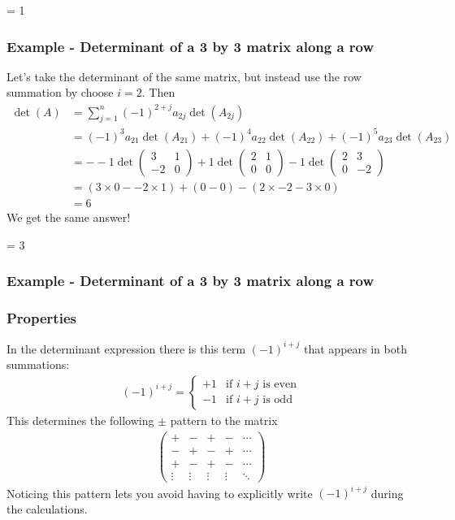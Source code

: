 \documentclass[usenames,dvipsnames,aspectratio=169,10pt]{beamer}
\def \EXAMPLEVERSION {1} %
\numberwithin{equation}{section}
\begin{document}
\ifnum \EXAMPLEVERSION = 1
\begin{frame}
\frametitle{Example - Determinant of a 3 by 3 matrix along a row}
Let's take the determinant of the same matrix, but instead use the row summation by choose $i=2$. Then
\begin{align*}
\det(A) &= \sum_{j=1}^n (-1)^{2+j} a_{2j} \det(A_{2j}) \\
 &= (-1)^{3} a_{21} \det(A_{21}) + (-1)^{4} a_{22} \det(A_{22}) + (-1)^{5} a_{23} \det(A_{23}) \\
 &= - -1 
 \det\begin{pmatrix}
  3 & 1 \\
 -2 & 0 
\end{pmatrix}
 + 1 
 \det\begin{pmatrix}
 2 &  1 \\
 0 &  0 
\end{pmatrix} 
- 1 
\det\begin{pmatrix}
 2 &  3 \\
 0 & -2 
\end{pmatrix} \\
 &= (3\times 0 - -2\times 1) + (0 - 0)- (2\times -2 - 3\times 0 ) \\
 &= 6
\end{align*}
We get the same answer!
\end{frame}
\fi 


\ifnum \EXAMPLEVERSION = 3
\begin{frame}
\frametitle{Example - Determinant of a 3 by 3 matrix along a row}
\end{frame}
\fi 



\begin{frame}
\frametitle{Properties}
In the determinant expression there is this term $(-1)^{i+j}$ that appears in both summations:
\begin{align*}
(-1)^{i+j} = 
\begin{cases}
+1 & \text{if $i+j$ is even} \\
-1 & \text{if $i+j$ is odd}
\end{cases}
\end{align*}
This determines the following $\pm$ pattern to the matrix\begin{align*}
\begin{pmatrix}
+ & - & + & - & \cdots \\
- & + & - & + & \cdots \\
+ & - & + & - & \cdots \\
\vdots & \vdots & \vdots & \vdots & \ddots
\end{pmatrix}
\end{align*}
Noticing this pattern lets you avoid having to explicitly write $(-1)^{i+j}$ during the calculations.
\end{frame}
\end{document}
